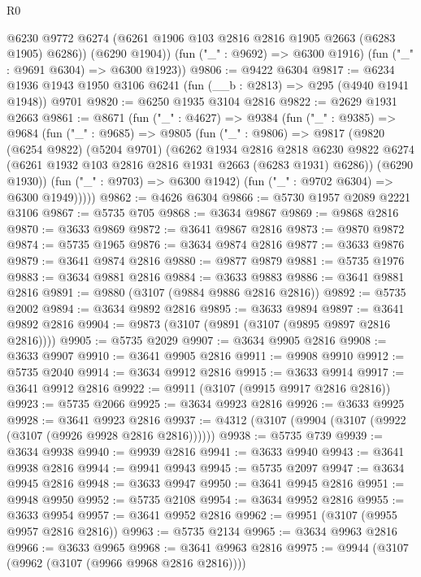 \begin{lexlean}{R0}
\begin{coremodule}
          @6230
          @9772
          @6274
          (@6261 @1906 @103 @2816 @2816 @1905 @2663 (@6283 @1905) @6286))
        (@6290 @1904))
      (fun ("_" : @9692) => @6300 @1916)
      (fun ("_" : @9691 @6304) => @6300 @1923))
@9806 := @9422 @6304
@9817 := @6234 @1936 @1943 @1950 @3106 @6241 (fun (__b : @2813) => @295 (@4940 @1941 @1948)) @9701
@9820 := @6250 @1935 @3104 @2816
@9822 := @2629 @1931 @2663
@9861 := @8671
    (fun ("_" : @4627) =>
    @9384
      (fun ("_" : @9385) =>
      @9684
        (fun ("_" : @9685) =>
        @9805
          (fun ("_" : @9806) =>
          @9817
            (@9820
              (@6254 @9822)
              (@5204 @9701)
              (@6262
                @1934
                @2816
                @2818
                @6230
                @9822
                @6274
                (@6261 @1932 @103 @2816 @2816 @1931 @2663 (@6283 @1931) @6286))
              (@6290 @1930))
            (fun ("_" : @9703) => @6300 @1942)
            (fun ("_" : @9702 @6304) => @6300 @1949)))))
@9862 := @4626 @6304
@9866 := @5730 @1957 @2089 @2221 @3106
@9867 := @5735 @705
@9868 := @3634 @9867
@9869 := @9868 @2816
@9870 := @3633 @9869
@9872 := @3641 @9867 @2816
@9873 := @9870 @9872
@9874 := @5735 @1965
@9876 := @3634 @9874 @2816
@9877 := @3633 @9876
@9879 := @3641 @9874 @2816
@9880 := @9877 @9879
@9881 := @5735 @1976
@9883 := @3634 @9881 @2816
@9884 := @3633 @9883
@9886 := @3641 @9881 @2816
@9891 := @9880 (@3107 (@9884 @9886 @2816 @2816))
@9892 := @5735 @2002
@9894 := @3634 @9892 @2816
@9895 := @3633 @9894
@9897 := @3641 @9892 @2816
@9904 := @9873 (@3107 (@9891 (@3107 (@9895 @9897 @2816 @2816))))
@9905 := @5735 @2029
@9907 := @3634 @9905 @2816
@9908 := @3633 @9907
@9910 := @3641 @9905 @2816
@9911 := @9908 @9910
@9912 := @5735 @2040
@9914 := @3634 @9912 @2816
@9915 := @3633 @9914
@9917 := @3641 @9912 @2816
@9922 := @9911 (@3107 (@9915 @9917 @2816 @2816))
@9923 := @5735 @2066
@9925 := @3634 @9923 @2816
@9926 := @3633 @9925
@9928 := @3641 @9923 @2816
@9937 := @4312 (@3107 (@9904 (@3107 (@9922 (@3107 (@9926 @9928 @2816 @2816))))))
@9938 := @5735 @739
@9939 := @3634 @9938
@9940 := @9939 @2816
@9941 := @3633 @9940
@9943 := @3641 @9938 @2816
@9944 := @9941 @9943
@9945 := @5735 @2097
@9947 := @3634 @9945 @2816
@9948 := @3633 @9947
@9950 := @3641 @9945 @2816
@9951 := @9948 @9950
@9952 := @5735 @2108
@9954 := @3634 @9952 @2816
@9955 := @3633 @9954
@9957 := @3641 @9952 @2816
@9962 := @9951 (@3107 (@9955 @9957 @2816 @2816))
@9963 := @5735 @2134
@9965 := @3634 @9963 @2816
@9966 := @3633 @9965
@9968 := @3641 @9963 @2816
@9975 := @9944 (@3107 (@9962 (@3107 (@9966 @9968 @2816 @2816))))

\end{coremodule}
\end{lexlean}
